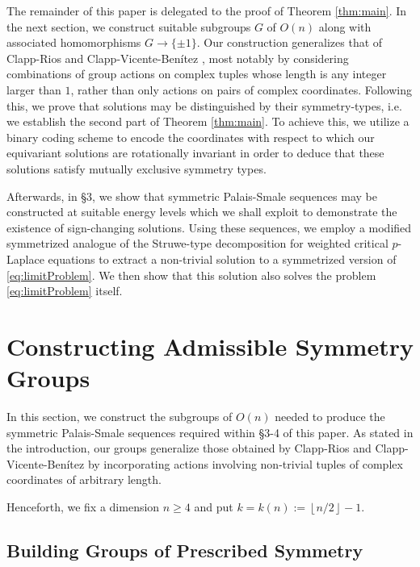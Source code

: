 \documentclass[10pt, reqno]{amsart}
\numberwithin{equation}{section}
\theoremstyle{definition}
\theoremstyle{remark}
\theoremstyle{plain}
\begin{document}
	
	The remainder of this paper is delegated to the proof of Theorem \ref{thm:main}. In the next section, we construct suitable subgroups $G$ of $O(n)$ along with associated homomorphisms $ G \to \{\pm 1\}$. Our construction generalizes that of Clapp-Rios \cite{clappRios} and Clapp-Vicente-Ben\'itez \cite{clapp2026entire}, most notably by considering combinations of group actions on complex tuples whose length is any integer larger than $1$, rather than only actions on pairs of complex coordinates.   Following this, we prove that solutions may be distinguished by their symmetry-types, i.e. we establish the second part of Theorem \ref{thm:main}. To achieve this, we utilize a binary coding scheme to encode the coordinates with respect to which our equivariant solutions are rotationally invariant in order to deduce that these solutions satisfy mutually exclusive symmetry types.
	
	Afterwards, in \S3, we show that symmetric Palais-Smale sequences may be constructed at suitable energy levels which we shall exploit to demonstrate the existence of sign-changing solutions. Using these sequences, we employ a modified symmetrized analogue of the Struwe-type decomposition for weighted critical $p$-Laplace equations to extract a non-trivial solution to a symmetrized version of \eqref{eq:limitProblem}. We then show that this solution also solves the problem \eqref{eq:limitProblem} itself. 
	
	\section{Constructing Admissible Symmetry Groups}
			
	In this section, we construct the subgroups of $O(n)$ needed to produce the symmetric Palais-Smale sequences required within \S3-4 of this paper. As stated in the introduction, our groups generalize those obtained by Clapp-Rios \cite{clappRios} and Clapp-Vicente-Ben\'itez \cite{clapp2026entire} by incorporating actions involving non-trivial tuples of complex coordinates of arbitrary length.
	
	Henceforth, we fix a dimension $n \ge 4$ and put $k = k(n) := \left\lfloor n/2\right\rfloor - 1$.
	
	\subsection{Building Groups of Prescribed Symmetry}
	
\end{document}
